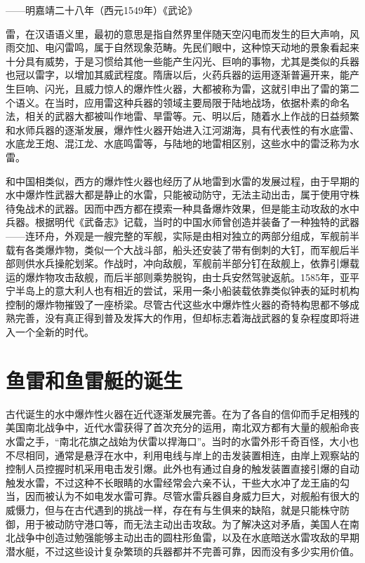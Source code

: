 \documentclass[12pt,UTF8]{ctexbook}
\begin{document}
——明嘉靖二十八年（西元1549年）《武论》

雷，在汉语语义里，最初的意思是指自然界里伴随天空闪电而发生的巨大声响，风雨交加、电闪雷鸣，属于自然现象范畴。先民们眼中，这种惊天动地的景象看起来十分具有威势，于是习惯给其他一些能产生闪光、巨响的事物，尤其是类似的兵器也冠以雷字，以增加其威武程度。隋唐以后，火药兵器的运用逐渐普遍开来，能产生巨响、闪光，且威力惊人的爆炸性火器，大都被称为雷，这就引申出了雷的第二个语义。在当时，应用雷这种兵器的领域主要局限于陆地战场，依据朴素的命名法，相关的武器大都被叫作地雷、旱雷等。元、明以后，随着水上作战的日益频繁和水师兵器的逐渐发展，爆炸性火器开始进入江河湖海，具有代表性的有水底雷、水底龙王炮、混江龙、水底鸣雷等，与陆地的地雷相区别，这些水中的雷泛称为水雷。

和中国相类似，西方的爆炸性火器也经历了从地雷到水雷的发展过程，由于早期的水中爆炸性武器大都是静止的水雷，只能被动防守，无法主动出击，属于使用守株待兔战术的武器。因而中西方都在摸索一种具备爆炸效果，但是能主动攻敌的水中兵器。根据明代《武备志》记载，当时的中国水师曾创造并装备了一种独特的武器——连环舟，外观是一艘完整的军舰，实际是由相对独立的两部分组成，军舰前半载有各类爆炸物，类似一个大战斗部，船头还安装了带有倒刺的大钉，而军舰后半部则供水兵操舵划桨。作战时，冲向敌舰，军舰前半部分钉在敌舰上，依靠引爆载运的爆炸物攻击敌舰，而后半部则乘势脱钩，由士兵安然驾驶返航。1585年，亚平宁半岛上的意大利人也有相近的尝试，采用一条小船装载依靠类似钟表的延时机构控制的爆炸物摧毁了一座桥梁。尽管古代这些水中爆炸性火器的奇特构思都不够成熟完善，没有真正得到普及发挥大的作用，但却标志着海战武器的复杂程度即将进入一个全新的时代。

\section{鱼雷和鱼雷艇的诞生}

古代诞生的水中爆炸性火器在近代逐渐发展完善。在为了各自的信仰而手足相残的美国南北战争中，近代水雷获得了首次充分的运用，南北双方都有大量的舰船命丧水雷之手，“南北花旗之战始为伏雷以捍海口”。当时的水雷外形千奇百怪，大小也不尽相同，通常是悬浮在水中，利用电线与岸上的击发装置相连，由岸上观察站的控制人员控握时机采用电击发引爆。此外也有通过自身的触发装置直接引爆的自动触发水雷，不过这种不长眼睛的水雷经常会六亲不认，干些大水冲了龙王庙的勾当，因而被认为不如电发水雷可靠。尽管水雷兵器自身威力巨大，对舰船有很大的威慑力，但与在古代遇到的挑战一样，存在有与生俱来的缺陷，就是只能株守防御，用于被动防守港口等，而无法主动出击攻敌。为了解决这对矛盾，美国人在南北战争中创造过勉强能够主动出击的圆柱形鱼雷，以及在水底暗送水雷攻敌的早期潜水艇，不过这些设计复杂繁琐的兵器都并不完善可靠，因而没有多少实用价值。
\end{document}

